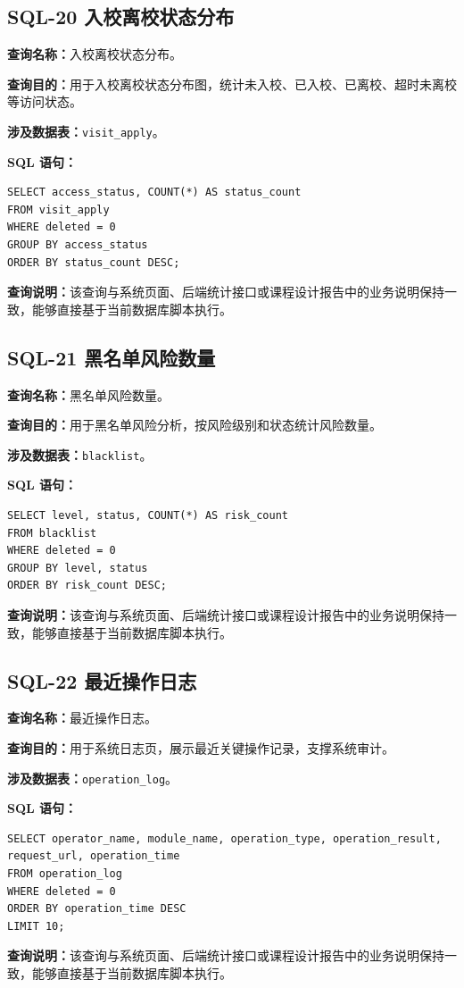 \subsection{SQL-20 入校离校状态分布}
\textbf{查询名称：}入校离校状态分布。\par
\textbf{查询目的：}用于入校离校状态分布图，统计未入校、已入校、已离校、超时未离校等访问状态。\par
\textbf{涉及数据表：}\texttt{visit\_apply}。\par
\textbf{SQL 语句：}
\begin{lstlisting}[style=sqlstyle]
SELECT access_status, COUNT(*) AS status_count
FROM visit_apply
WHERE deleted = 0
GROUP BY access_status
ORDER BY status_count DESC;
\end{lstlisting}
\textbf{查询说明：}该查询与系统页面、后端统计接口或课程设计报告中的业务说明保持一致，能够直接基于当前数据库脚本执行。

\subsection{SQL-21 黑名单风险数量}
\textbf{查询名称：}黑名单风险数量。\par
\textbf{查询目的：}用于黑名单风险分析，按风险级别和状态统计风险数量。\par
\textbf{涉及数据表：}\texttt{blacklist}。\par
\textbf{SQL 语句：}
\begin{lstlisting}[style=sqlstyle]
SELECT level, status, COUNT(*) AS risk_count
FROM blacklist
WHERE deleted = 0
GROUP BY level, status
ORDER BY risk_count DESC;
\end{lstlisting}
\textbf{查询说明：}该查询与系统页面、后端统计接口或课程设计报告中的业务说明保持一致，能够直接基于当前数据库脚本执行。

\subsection{SQL-22 最近操作日志}
\textbf{查询名称：}最近操作日志。\par
\textbf{查询目的：}用于系统日志页，展示最近关键操作记录，支撑系统审计。\par
\textbf{涉及数据表：}\texttt{operation\_log}。\par
\textbf{SQL 语句：}
\begin{lstlisting}[style=sqlstyle]
SELECT operator_name, module_name, operation_type, operation_result, request_url, operation_time
FROM operation_log
WHERE deleted = 0
ORDER BY operation_time DESC
LIMIT 10;
\end{lstlisting}
\textbf{查询说明：}该查询与系统页面、后端统计接口或课程设计报告中的业务说明保持一致，能够直接基于当前数据库脚本执行。

